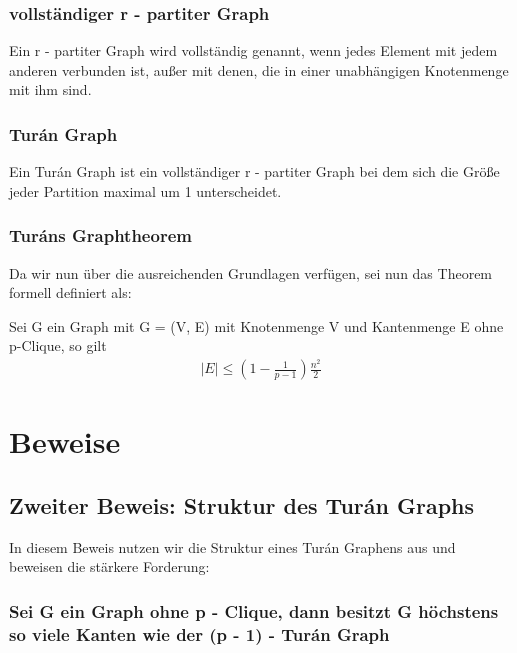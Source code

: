 \documentclass[12pt, a4paper]{article}
\begin{document}
\subsection{vollständiger r - partiter Graph}
\label{theorem:vollstandiger-r-partiter-graph}
Ein r - partiter Graph wird vollständig genannt, wenn jedes Element mit jedem anderen verbunden ist, außer mit denen, die in einer unabhängigen Knotenmenge mit ihm sind.


\subsection{Turán Graph}
\label{theorem:turan-graph}
Ein Turán Graph ist ein vollständiger r - partiter Graph bei dem sich die Größe jeder Partition maximal um 1 unterscheidet.


\subsection{Turáns Graphtheorem}

Da wir nun über die ausreichenden Grundlagen verfügen, sei nun das Theorem formell definiert als:

Sei G ein Graph mit G = (V, E) mit Knotenmenge V und Kantenmenge E ohne p-Clique, so gilt
\begin{align}
\mid E \mid \le (1- \frac{1}{p-1}) \frac{n^2}{2}
\end{align}





\chapter{Beweise}
\label{proof::doc}\label{proof:beweise}

\section{Zweiter Beweis: Struktur des Turán Graphs}
\label{proof/second:zweiter-beweis-struktur-des-turan-graphs}\label{proof/second::doc}
In diesem Beweis nutzen wir die Struktur eines Turán Graphens aus und beweisen die stärkere Forderung:


\subsection{Sei G ein Graph ohne p - Clique, dann besitzt G höchstens so viele Kanten wie der (p - 1) - Turán Graph}
\label{proof/second:sei-g-ein-graph-ohne-p-clique-dann-besitzt-g-hochstens-so-viele-kanten-wie-der-p-1-turan-graph}
\end{document}

